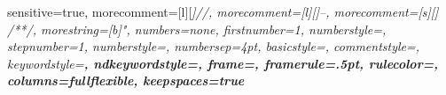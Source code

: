 {    %
  sensitive=true,  
  morecomment=[l][\itshape \color{commentcolor}]//,
  morecomment=[l][\itshape \color{commentcolor}]{--},
  morecomment=[s][\itshape \color{commentcolor}] {/*}{*/},
  morestring=[b]",
  numbers=none,
  firstnumber=1,
  numberstyle=\tiny,
  stepnumber=1,
  numberstyle=\tiny\color{gray!50},
  numbersep=4pt,
  basicstyle=\footnotesize\ttfamily,
  commentstyle=\footnotesize\itshape,
  keywordstyle=\footnotesize\ttfamily\bfseries\color{black},
  ndkeywordstyle=\footnotesize\bfseries,
  frame=,
  framerule=.5pt,
  rulecolor=\color{bordegray!50},
  columns=fullflexible,
  keepspaces=true
}
